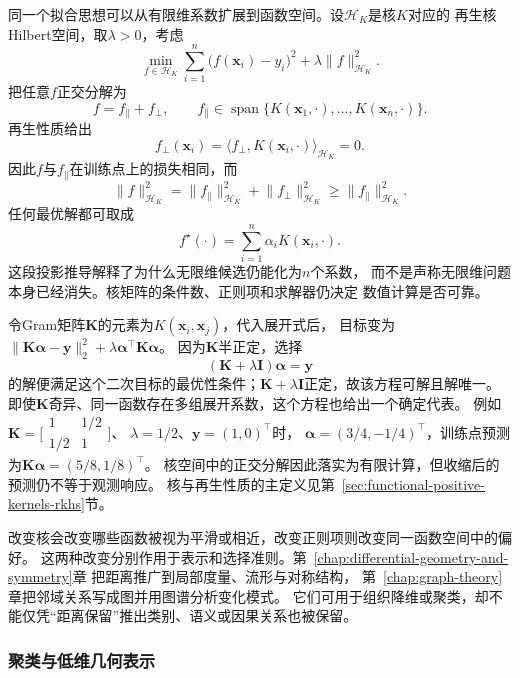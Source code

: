 同一个拟合思想可以从有限维系数扩展到函数空间。设$\mathcal{H}_K$是核$K$对应的
再生核Hilbert空间，取$\lambda>0$，考虑
\[
  \min_{f\in\mathcal{H}_K}
  \sum_{i=1}^{n}
  \bigl(f(\bm{x}_i)-y_i\bigr)^2
  +
  \lambda\lVert f\rVert_{\mathcal{H}_K}^{2}.
\]
把任意$f$正交分解为
\[
  f=f_{\parallel}+f_{\perp},
  \qquad
  f_{\parallel}
  \in
  \operatorname{span}
  \{K(\bm{x}_1,\cdot),\ldots,K(\bm{x}_n,\cdot)\}.
\]
再生性质给出
\[
  f_{\perp}(\bm{x}_i)
  =
  \langle
    f_{\perp},K(\bm{x}_i,\cdot)
  \rangle_{\mathcal{H}_K}
  =0.
\]
因此$f$与$f_{\parallel}$在训练点上的损失相同，而
\[
  \lVert f\rVert_{\mathcal{H}_K}^{2}
  =
  \lVert f_{\parallel}\rVert_{\mathcal{H}_K}^{2}
  +
  \lVert f_{\perp}\rVert_{\mathcal{H}_K}^{2}
  \geq
  \lVert f_{\parallel}\rVert_{\mathcal{H}_K}^{2}.
\]
任何最优解都可取成
\begin{equation}
  f^\star(\cdot)
  =
  \sum_{i=1}^{n}\alpha_i K(\bm{x}_i,\cdot).
  \label{eq:future-kernel-representation}
\end{equation}
这段投影推导解释了为什么无限维候选仍能化为$n$个系数，
而不是声称无限维问题本身已经消失。核矩阵的条件数、正则项和求解器仍决定
数值计算是否可靠。

令Gram矩阵$\bm K$的元素为$K(\bm x_i,\bm x_j)$，代入展开式后，
目标变为$\|\bm K\bm\alpha-\bm y\|_2^2+\lambda\bm\alpha^\top\bm K\bm\alpha$。
因为$\bm K$半正定，选择
\[
  (\bm K+\lambda\bm I)\bm\alpha=\bm y
\]
的解便满足这个二次目标的最优性条件；$\bm K+\lambda\bm I$正定，故该方程可解且解唯一。
即使$\bm K$奇异、同一函数存在多组展开系数，这个方程也给出一个确定代表。
例如$\bm K=\bigl[\begin{smallmatrix}1&1/2\\1/2&1\end{smallmatrix}\bigr]$、
$\lambda=1/2$、$\bm y=(1,0)^\top$时，
$\bm\alpha=(3/4,-1/4)^\top$，训练点预测为$\bm K\bm\alpha=(5/8,1/8)^\top$。
核空间中的正交分解因此落实为有限计算，但收缩后的预测仍不等于观测响应。
核与再生性质的主定义见第~\ref{sec:functional-positive-kernels-rkhs}节。

改变核会改变哪些函数被视为平滑或相近，改变正则项则改变同一函数空间中的偏好。
这两种改变分别作用于表示和选择准则。第~\ref{chap:differential-geometry-and-symmetry}章
把距离推广到局部度量、流形与对称结构，
第~\ref{chap:graph-theory}章把邻域关系写成图并用图谱分析变化模式。
它们可用于组织降维或聚类，却不能仅凭“距离保留”推出类别、语义或因果关系也被保留。

\subsubsection{聚类与低维几何表示}
\label{sec:future-prediction-clusters-low-dimensional-relations}

